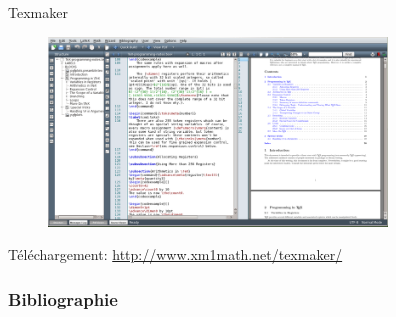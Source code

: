 \documentclass{beamer}
\begin{document}

\begin{frame}{Texmaker}

\begin{figure}
\centering
\includegraphics[width=9cm]{img/TexmakerView}
\end{figure}

{\footnotesize Téléchargement: \url{http://www.xm1math.net/texmaker/}}

\end{frame}











\begin{frame}
  \frametitle{Bibliographie}

\nocite{*}


\end{frame}


\end{document}
